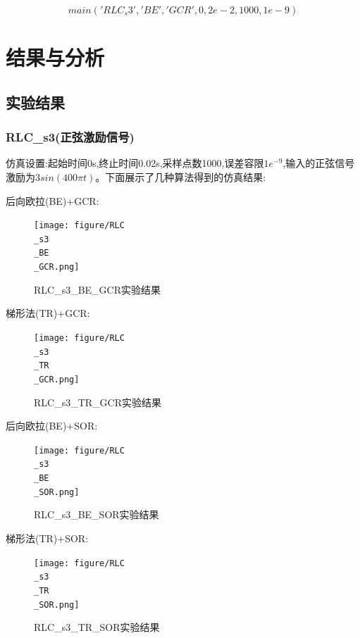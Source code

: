 \documentclass[12pt]{article}
\begin{document}
\begin{sloppypar}
\begin{equation}
  main('RLC_s3','BE','GCR',0 ,2e-2,1000,1e-9)
\end{equation}

\section{结果与分析}
\subsection{实验结果}
\subsubsection{RLC\_s3(正弦激励信号)}
\qquad 仿真设置:起始时间0s,终止时间0.02s,采样点数1000,误差容限$1e^{-9}$,输入的正弦信号激励为$3sin(400\pi t)$。下面展示了几种算法得到的仿真结果:

后向欧拉(BE)+GCR:

\begin{figure}[H]
  \centering
  \texttt{[image: figure/RLC\\\_s3\\\_BE\\\_GCR.png]}
  \caption{RLC\_s3\_BE\_GCR实验结果}
\end{figure}

梯形法(TR)+GCR:

\begin{figure}[H]
  \centering
  \texttt{[image: figure/RLC\\\_s3\\\_TR\\\_GCR.png]}
  \caption{RLC\_s3\_TR\_GCR实验结果}
\end{figure}

后向欧拉(BE)+SOR:

\begin{figure}[H]
  \centering
  \texttt{[image: figure/RLC\\\_s3\\\_BE\\\_SOR.png]}
  \caption{RLC\_s3\_BE\_SOR实验结果}
\end{figure}

梯形法(TR)+SOR:

\begin{figure}[H]
  \centering
  \texttt{[image: figure/RLC\\\_s3\\\_TR\\\_SOR.png]}
  \caption{RLC\_s3\_TR\_SOR实验结果}
\end{figure}


\end{sloppypar}
\end{document}
